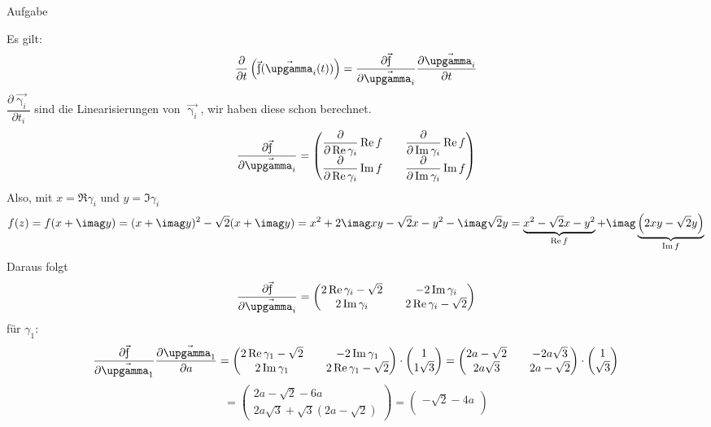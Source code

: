 \documentclass{scrartcl}
\begin{document}
\begin{section}{Aufgabe}
\begin{itemize}
Es gilt: \[\frac{\partial}{\partial t}\left(\f(\vec{\upgamma}_i(t))\right)=\dfrac{\partial \f}{\partial \vec{\upgamma_i}}\dfrac{\partial \vec{\upgamma_i}}{\partial t}\]
\(\dfrac{\partial \vec{\upgamma_i}}{\partial t_i}\) sind die Linearisierungen von $\vec{\upgamma_i}$, wir haben diese schon berechnet.
\[\dfrac{\partial \f}{\partial \vec{\upgamma_i}}=
\begin{pmatrix}
    \dfrac{\partial}{\partial \Re \gamma_i}\Re f&& \dfrac{\partial}{\partial \Im \gamma_i}\Re f\\
    \dfrac{\partial}{\partial \Re \gamma_i}\Im f&& \dfrac{\partial}{\partial \Im \gamma_i}\Im f
\end{pmatrix}\]
Also, mit \(x=\Re \gamma_i\) und \(y=\Im \gamma_i\)
\[f(z)=f(x+\imag y)
=(x+\imag y)^2-\sqrt{2} (x+\imag y)
=x^2+2 \imag x y-\sqrt{2} x-y^2-\imag \sqrt{2} y
=\underbrace{x^2-\sqrt{2} x-y^2}_{\Re f}
+\imag\underbrace{\left(2 x y-\sqrt{2} y\right)}_{\Im f}\]
Daraus folgt\[\frac{\partial \f}{\partial \vec{\upgamma_i}}=
\begin{pmatrix}
    2\Re \gamma_i -\sqrt{2}&& -2\Im \gamma_i\\
    2\Im \gamma_i&& 2\Re \gamma_i -\sqrt{2}
\end{pmatrix}\]
für \(\gamma_1\):
\newcommand{\pfa}{\frac{\partial \f}{\partial \vec{\upgamma_1}}\frac{\partial \vec{\upgamma_1}}{\partial a}}
\newcommand{\pfb}{\frac{\partial \f}{\partial \vec{\upgamma_2}}\frac{\partial \vec{\upgamma_2}}{\partial b}}
\[\pfa=
\begin{pmatrix}
    2\Re \gamma_1 -\sqrt{2}&& -2\Im \gamma_1\\
    2\Im \gamma_1&& 2\Re \gamma_1 -\sqrt{2}
\end{pmatrix}
\cdot\begin{pmatrix}1\\1\sqrt{3}\end{pmatrix}
=
\begin{pmatrix}
    2a -\sqrt{2}&& -2a\sqrt{3}\\
    2a\sqrt{3}&& 2a -\sqrt{2}
\end{pmatrix}
\cdot\begin{pmatrix}1\\\sqrt{3}\end{pmatrix}
\]
\[=\begin{pmatrix}
    2a-\sqrt{2}-6a\\
    2a\sqrt{3}+\sqrt{3}(2a -\sqrt{2})
\end{pmatrix}
=\begin{pmatrix}
    -\sqrt{2}-4a\\

\end{pmatrix}\]
\end{itemize}
\end{section}
\end{document}
